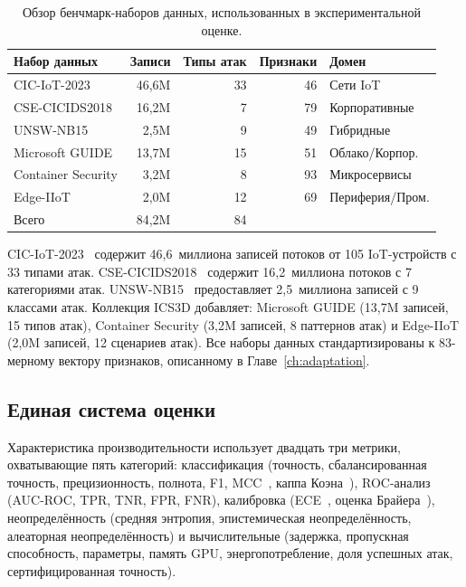 \begin{table}[htbp]
\centering
\caption{Обзор бенчмарк-наборов данных, использованных в экспериментальной оценке.}
\label{tab:datasets}
\begin{tabular}{lrrrl}
\toprule
Набор данных & Записи & Типы атак & Признаки & Домен \\
\midrule
CIC-IoT-2023      & 46,6M & 33 & 46 & Сети IoT \\
CSE-CICIDS2018     & 16,2M &  7 & 79 & Корпоративные \\
UNSW-NB15          &  2,5M &  9 & 49 & Гибридные \\
Microsoft GUIDE    & 13,7M & 15 & 51 & Облако/Корпор. \\
Container Security &  3,2M &  8 & 93 & Микросервисы \\
Edge-IIoT          &  2,0M & 12 & 69 & Периферия/Пром. \\
\midrule
Всего              & 84,2M & 84 &    & \\
\bottomrule
\end{tabular}
\end{table}

CIC-IoT-2023~\cite{Neto2023,Ring2019} содержит 46,6~миллиона записей потоков от 105 IoT-устройств с 33 типами атак. CSE-CICIDS2018~\cite{Sharafaldin2018} содержит 16,2~миллиона потоков с 7 категориями атак. UNSW-NB15~\cite{Moustafa2015,Mirsky2018} предоставляет 2,5~миллиона записей с 9 классами атак. Коллекция ICS3D добавляет: Microsoft GUIDE (13,7M записей, 15 типов атак), Container Security (3,2M записей, 8 паттернов атак) и Edge-IIoT (2,0M записей, 12 сценариев атак). Все наборы данных стандартизированы к 83-мерному вектору признаков, описанному в Главе~\ref{ch:adaptation}.


\subsection{Единая система оценки}

Характеристика производительности использует двадцать три метрики, охватывающие пять категорий: классификация (точность, сбалансированная точность, прецизионность, полнота, F1, MCC~\cite{Matthews1975}, каппа Коэна~\cite{Cohen1960}), ROC-анализ (AUC-ROC, TPR, TNR, FPR, FNR), калибровка (ECE~\cite{Naeini2015}, оценка Брайера~\cite{Brier1950}), неопределённость (средняя энтропия, эпистемическая неопределённость, алеаторная неопределённость) и вычислительные (задержка, пропускная способность, параметры, память GPU, энергопотребление, доля успешных атак, сертифицированная точность).


